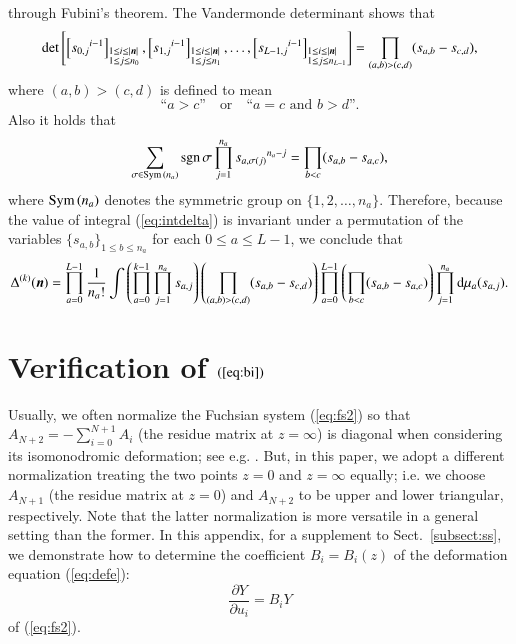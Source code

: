 \documentclass[12pt]{article}
\numberwithin{equation}{section}
\begin{document}
through Fubini's theorem.
The Vandermonde determinant
shows that
\[
\det \left[
\left[ {s_{0,j}}^{i-1} \right]_{
\begin{subarray}{l}
1 \leq i \leq |{\boldsymbol n}|\\
1 \leq j \leq n_0 
\end{subarray}},
\left[ {s_{1,j}}^{i-1} \right]_{
\begin{subarray}{l}
1 \leq i \leq |{\boldsymbol n}|\\
1 \leq j \leq n_1 
\end{subarray}},
\ldots,
\left[ {s_{L-1,j}}^{i-1}  \right]_{
\begin{subarray}{l}
1 \leq i \leq |{\boldsymbol n}|\\
1 \leq j \leq n_{L-1} 
\end{subarray}}
\right]
=
\prod_{(a,b)>(c,d)} 
(s_{a,b}-s_{c,d}),
\]
where
$(a,b)>(c,d)$
is defined 
to mean
\[
\text{``$a>c$''}
\quad  \text{or} \quad
\text{``$a=c$ and $b >d$''.}
\]
Also it holds that
\[
\sum_{\sigma \in {\rm Sym \, }(n_a) } 
{\rm sgn \, } \sigma
\prod_{j=1}^{n_a} 
{s_{a,\sigma(j)}}^{n_a-j}
=\prod_{b<c} 
(s_{a,b}-s_{a,c}),
\]
where ${\rm Sym \, }(n_a)$
denotes the symmetric group on 
$\{1,2,\ldots,n_a\}$.
Therefore, 
because 
the value of integral (\ref{eq:intdelta})
 is 
invariant under a permutation of the variables $\{s_{a,b} \}_{1 \leq b \leq n_a}$
for each $0 \leq a \leq L-1$,
we conclude that
\[
\Delta^{(k)}({\boldsymbol n})
=
\prod_{a=0}^{L-1}
\frac{1}{n_a !}
\int
\left(\prod_{a=0}^{k-1}
\prod_{j=1}^{n_a} 
s_{a,j}
\right)
\left(
\prod_{(a,b)>(c,d)} 
(s_{a,b}-s_{c,d})
\right)
\prod_{a=0}^{L-1}
\left(
\prod_{b<c}
(s_{a,b}-s_{a,c})
\right)
\prod_{j=1}^{n_a} 
{\rm d}\mu_a(s_{a,j}).
\]



\appendix
\section{Verification of $(\ref{eq:bi})$}


Usually, we often normalize the Fuchsian system (\ref{eq:fs2}) 
so that $A_{N+2}=-\sum_{i=0}^{N+1} A_i $ 
(the residue matrix at $z=\infty$)
is diagonal
when considering its isomonodromic deformation;
see e.g. \cite{jmu81}.
But, in this paper, we adopt a different normalization
treating the two points 
$z=0$ and $z=\infty$ equally;
i.e.
we choose
$A_{N+1}$ (the residue matrix at $z=0$)
and $A_{N+2}$
to be upper and lower triangular,
respectively.
Note that the latter normalization is more versatile in
a general setting than the former.
In this appendix,
for a supplement to
Sect.~\ref{subsect:ss},
we demonstrate how to determine the coefficient $B_i=B_i(z)$ of 
the deformation equation (\ref{eq:defe}):
\[
\frac{\partial Y}{\partial u_i} =B_i Y
\]
 of (\ref{eq:fs2}).
\end{document}
